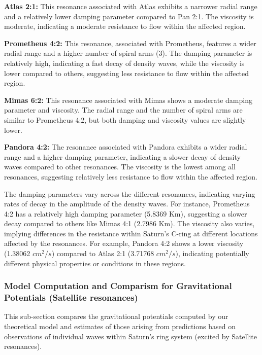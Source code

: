 \documentclass{article}
\begin{document}
\textbf{Atlas 2:1:}
This resonance associated with Atlas exhibits a narrower radial range and a relatively lower damping parameter compared to Pan 2:1. The viscosity is moderate, indicating a moderate resistance to flow within the affected region.

\textbf{Prometheus 4:2:}
This resonance, associated with Prometheus, features a wider radial range and a higher number of spiral arms (3). The damping parameter is relatively high, indicating a fast decay of density waves, while the viscosity is lower compared to others, suggesting less resistance to flow within the affected region.

\textbf{Mimas 6:2:}
This resonance associated with Mimas shows a moderate damping parameter and viscosity. The radial range and the number of spiral arms are similar to Prometheus 4:2, but both damping and viscosity values are slightly lower.

\textbf{Pandora 4:2:}
The resonance associated with Pandora exhibits a wider radial range and a higher damping parameter, indicating a slower decay of density waves compared to other resonances. The viscosity is the lowest among all resonances, suggesting relatively less resistance to flow within the affected region.

The damping parameters vary across the different resonances, indicating varying rates of decay in the amplitude of the density waves. For instance, Prometheus 4:2 has a relatively high damping parameter (5.8369 Km), suggesting a slower decay compared to others like Mimas 4:1 (2.7986 Km). The viscosity also varies, implying differences in the resistance within Saturn's C-ring at different locations affected by the resonances. For example, Pandora 4:2 shows a lower viscosity (1.38062 $cm^{2}/s$) compared to Atlas 2:1 (3.71768 $cm^{2}/s$), indicating potentially different physical properties or conditions in these regions.


\subsubsection{Model Computation and Comparism for Gravitational Potentials (Satellite resonances)}

This sub-section compares the gravitational potentials computed by our theoretical model and estimates of those arising from predictions based on observations of individual waves within Saturn's ring system (excited by Satellite resonances).
\end{document}
